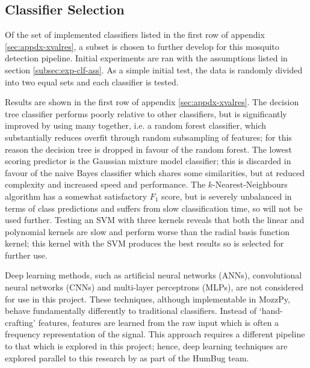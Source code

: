      
    \subsection{Classifier Selection}
    \label{subsec:exp-clf-select}
        Of the set of implemented classifiers listed in the first row of appendix \ref{sec:appdx-xvalres}, a subset is chosen to further develop for this mosquito detection pipeline. Initial experiments are ran with the assumptions listed in section \ref{subsec:exp-clf-ass}. As a simple initial test, the data is randomly divided into two equal sets and each classifier is tested.
        
        Results are shown in the first row of appendix \ref{sec:appdx-xvalres}. The decision tree classifier performs poorly relative to other classifiers, but is significantly improved by using many together, i.e. a random forest classifier, which substantially reduces overfit through random subsampling of features; for this reason the decision tree is dropped in favour of the random forest. The lowest scoring predictor is the Gaussian mixture model classifier; this is discarded in favour of the naive Bayes classifier which shares some similarities, but at reduced complexity and increased speed and performance. The $k$-Nearest-Neighbours algorithm has a somewhat satisfactory $F_1$ score, but is severely unbalanced in terms of class predictions and suffers from slow classification time, so will not be used further. Testing an SVM with three kernels reveals that both the linear and polynomial kernels are slow and perform worse than the radial basis function kernel; this kernel with the SVM produces the best results so is selected for further use.

        Deep learning methods, such as artificial neural networks (ANNs), convolutional neural networks (CNNs) and multi-layer perceptrons (MLPs), are not considered for use in this project. These techniques, although implementable in MozzPy, behave fundamentally differently to traditional classifiers. Instead of `hand-crafting' features, features are learned from the raw input which is often a frequency representation of the signal. This approach requires a different pipeline to that which is explored in this project; hence, deep learning techniques are explored parallel to this research by \textcite{Kiskin} as part of the HumBug team.
        
        
        

